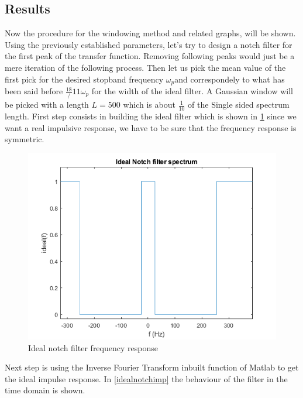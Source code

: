\documentclass[12pt,a4paper,twoside]{article}
\begin{document}
\subsection{Results}

Now the procedure for the windowing method and related graphs, will be shown. Using the previously established parameters, let's try to design a notch filter for the first peak of the transfer function. Removing following peaks would just be a mere iteration of the following process.
Then let us pick the mean value of the first pick for the desired stopband frequency $\omega_{p} $and correspondely to what has been said before $\frac{18}/{11} \omega_{p}$ for the width of the ideal filter. A Gaussian window will be picked with a length $L = 500$ which is about $\frac{1}{10}$ of the Single sided spectrum length.
First step consists in building the ideal filter which is shown in \figurename{ \ref{idealnotch}} since we want a real impulsive response, we have to be sure that the frequency response is symmetric.

\begin{figure}[h!]
	\centering
	\includegraphics[width=0.8\linewidth]{Images/idealnotch.png}
	\caption{Ideal notch filter frequency response}
	\label{idealnotch}
\end{figure}
\noindent

Next step is using the Inverse Fourier Transform inbuilt function of Matlab to get the ideal impulse response. In \figurename{ \ref{idealnotchimp}} the behaviour of the filter in the time domain is shown.
\end{document}
